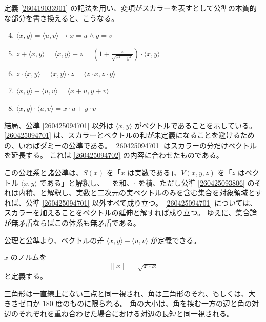 定義 \ref{260419033901} の記法を用い、変項がスカラーを表すとして公準の本質的な部分を書き換えると、こうなる。

\begin{enumerate}
  \setcounter{enumi}{3}
  \item \(\langle x,y\rangle=\langle u,v\rangle\rightarrow x=u\land y=v\)
  \item\label{260425094701} \(\displaystyle z+\langle x,y\rangle=\langle x,y\rangle+z=\left(1+\frac{z}{\sqrt{x^2+y^2}}\right)\cdot\langle x,y\rangle\)
  \item\label{260425094702} \(z\cdot\langle x,y\rangle=\langle x,y\rangle\cdot z=\langle z\cdot x,z\cdot y\rangle\)
  \item \(\langle x,y\rangle+\langle u,v\rangle=\langle x+u,y+v\rangle\)
  \item\label{260425093806} \(\langle x,y\rangle\cdot\langle u,v\rangle=x\cdot u+y\cdot v\)
\end{enumerate}

結局、公準 \ref{260425094701} 以外は \(\langle x,y\rangle\) がベクトルであることを示している。
\ref{260425094701} は、スカラーとベクトルの和が未定義になることを避けるための、いわばダミーの公準である。
\ref{260425094701} はスカラーの分だけベクトルを延長する。
これは \ref{260425094702} の内容に合わせたものである。

この公理系と諸公準は、\(S(x)\) を「\(x\) は実数である」、\(V(x,y,z)\) を「\(z\) はベクトル \(\langle x,y\rangle\) である」と解釈し、\(+\) を和、\(\cdot\) を積、ただし公準 \ref{260425093806} のそれは内積、と解釈し、実数と二次元の実ベクトルのみを含む集合を対象領域とすれば、公準 \ref{260425094701} 以外すべて成り立つ。
\ref{260425094701} については、スカラーを加えることをベクトルの延伸と解すれば成り立つ。
ゆえに、集合論が無矛盾ならばこの体系も無矛盾である。

公理と公準より、ベクトルの差 \(\langle x,y\rangle-\langle u,v\rangle\) が定義できる。


\begin{dfn}
  \(x\) のノルムを
  \[\|x\|=\sqrt{x\cdot x}\]
  と定義する。
\end{dfn}

三角形は一直線上にない三点と同一視され、角は三角形のそれ、もしくは、大きさゼロか \(180\) 度のものに限られる。
角の大小は、角を挟む一方の辺と角の対辺のそれぞれを重ね合わせた場合における対辺の長短と同一視される。



